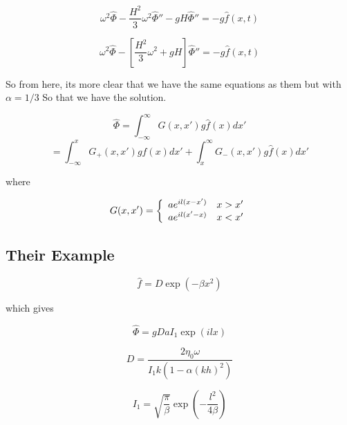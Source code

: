 \documentclass[12pt]{article}
\begin{document}
\[  \omega^2\hat{\Phi} - \frac{H^2}{3} \omega^2\hat{\Phi}'' - gH\hat{\Phi}''= -g\hat{f}(x,t) \]

\[  \omega^2\hat{\Phi} - \left[ \frac{H^2}{3} \omega^2 + gH\right]\hat{\Phi}''= -g\hat{f}(x,t) \]

So from here, its more clear that we have the same equations as them but with $\alpha = 1/3$ So that we have the solution.

\[\hat{\Phi} = \int_{-\infty}^{\infty} G(x,x')g\hat{f}(x) dx'\]
\[ = \int_{-\infty}^{x} G_+(x,x')g\hat{f}(x) dx' + \int_{x}^{\infty} G_-(x,x')g\hat{f}(x) dx' \]

where

\[G(x,x') = \left\lbrace \begin{array}{c c}
ae^{il(x - x')} & x > x' \\ ae^{il(x' - x)} & x < x'
\end{array} \right.\]

\subsection{Their Example}

\[\hat{f} = D \exp\left(-\beta x^2\right)\]

which gives

\[\hat{\Phi} = gDaI_1 \exp\left(ilx\right)\]

\[D = \frac{2 \eta_0 \omega}{I_1 k(1 - \alpha(kh)^2)}\]

\[I_1= \sqrt{\frac{\pi}{\beta}} \exp\left( - \frac{l^2}{4\beta}\right)\]
\end{document}
